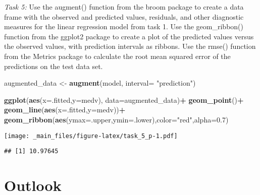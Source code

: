 \documentclass[
]{book}
\newenvironment{Shaded}{\begin{snugshade}}{\end{snugshade}}
\newcommand{\AttributeTok}[1]{\textcolor[rgb]{0.13,0.29,0.53}{#1}}
\newcommand{\FloatTok}[1]{\textcolor[rgb]{0.00,0.00,0.81}{#1}}
\newcommand{\FunctionTok}[1]{\textcolor[rgb]{0.13,0.29,0.53}{\textbf{#1}}}
\newcommand{\NormalTok}[1]{#1}
\newcommand{\OtherTok}[1]{\textcolor[rgb]{0.56,0.35,0.01}{#1}}
\newcommand{\SpecialCharTok}[1]{\textcolor[rgb]{0.81,0.36,0.00}{\textbf{#1}}}
\newcommand{\StringTok}[1]{\textcolor[rgb]{0.31,0.60,0.02}{#1}}
\begin{document}
\emph{Task 5:} Use the augment() function from the broom package to create a data frame with the observed and predicted values, residuals, and other diagnostic measures for the linear regression model from task 1. Use the geom\_ribbon() function from the ggplot2 package to create a plot of the predicted values versus the observed values, with prediction intervals as ribbons. Use the rmse() function from the Metrics package to calculate the root mean squared error of the predictions on the test data set.

\begin{Shaded}
\begin{Highlighting}[]
\NormalTok{augmented\_data }\OtherTok{\textless{}{-}} \FunctionTok{augment}\NormalTok{(model, }\AttributeTok{interval=} \StringTok{"prediction"}\NormalTok{)}

  \FunctionTok{ggplot}\NormalTok{(}\FunctionTok{aes}\NormalTok{(}\AttributeTok{x=}\NormalTok{.fitted,}\AttributeTok{y=}\NormalTok{medv), }\AttributeTok{data=}\NormalTok{augmented\_data)}\SpecialCharTok{+}
  \FunctionTok{geom\_point}\NormalTok{()}\SpecialCharTok{+}
  \FunctionTok{geom\_line}\NormalTok{(}\FunctionTok{aes}\NormalTok{(}\AttributeTok{x=}\NormalTok{.fitted,}\AttributeTok{y=}\NormalTok{medv))}\SpecialCharTok{+}
  \FunctionTok{geom\_ribbon}\NormalTok{(}\FunctionTok{aes}\NormalTok{(}\AttributeTok{ymax=}\NormalTok{.upper,}\AttributeTok{ymin=}\NormalTok{.lower),}\AttributeTok{color=}\StringTok{"red"}\NormalTok{,}\AttributeTok{alpha=}\FloatTok{0.7}\NormalTok{)}
\end{Highlighting}
\end{Shaded}

\texttt{[image: \_main\_files/figure-latex/task\_5\_p-1.pdf]}

\begin{Shaded}
\end{Shaded}

\begin{verbatim}
## [1] 10.97645
\end{verbatim}

\hypertarget{out-look}{%
\chapter{Outlook}\label{out-look}}
\end{document}
